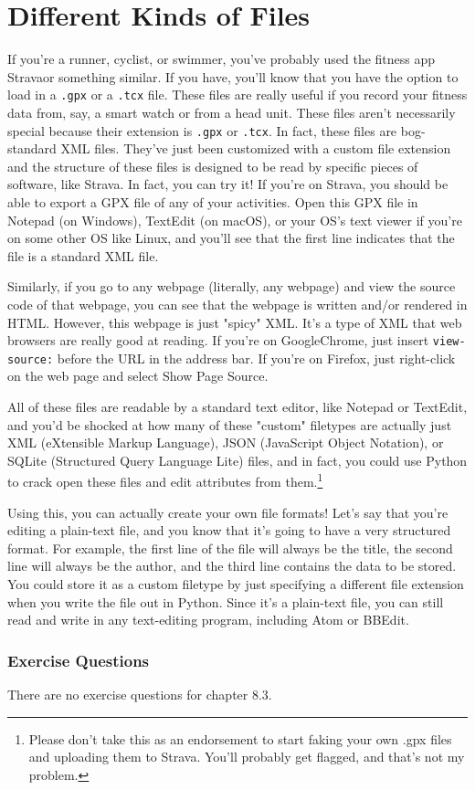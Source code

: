 \section{Different Kinds of Files}
If you're a runner, cyclist, or swimmer, you've probably used the fitness app Strava\textregistered or something similar. If you have, you'll know that you have the option to load in a \verb|.gpx| or a \verb|.tcx| file. These files are really useful if you record your fitness data from, say, a smart watch or from a head unit. These files aren't necessarily special because their extension is \verb|.gpx| or \verb|.tcx|. In fact, these files are bog-standard XML files. They've just been customized with a custom file extension and the structure of these files is designed to be read by specific pieces of software, like Strava\textregistered. In fact, you can try it! If you're on Strava\textregistered, you should be able to export a GPX file of any of your activities. Open this GPX file in Notepad (on Windows), TextEdit (on macOS), or your OS's text viewer if you're on some other OS like Linux, and you'll see that the first line indicates that the file is a standard XML file.\par
Similarly, if you go to any webpage (literally, any webpage) and view the source code of that webpage, you can see that the webpage is written and/or rendered in HTML. However, this webpage is just "spicy" XML. It's a type of XML that web browsers are really good at reading. If you're on Google\textregistered Chrome\textregistered, just insert \verb|view-source:| before the URL in the address bar. If you're on Firefox, just right-click on the web page and select Show Page Source.\par
All of these files are readable by a standard text editor, like Notepad or TextEdit, and you'd be shocked at how many of these "custom" filetypes are actually just XML (eXtensible Markup Language), JSON (JavaScript Object Notation), or SQLite (Structured Query Language Lite) files, and in fact, you could use Python to crack open these files and edit attributes from them.\footnote{Please don't take this as an endorsement to start faking your own .gpx files and uploading them to Strava\textregistered. You'll probably get flagged, and that's not my problem.}\par
Using this, you can actually create your own file formats! Let's say that you're editing a plain-text file, and you know that it's going to have a very structured format. For example, the first line of the file will always be the title, the second line will always be the author, and the third line contains the data to be stored. You could store it as a custom filetype by just specifying a different file extension when you write the file out in Python. Since it's a plain-text file, you can still read and write in any text-editing program, including Atom or BBEdit\textregistered.\par
\subsubsection*{Exercise Questions}
There are no exercise questions for chapter 8.3.